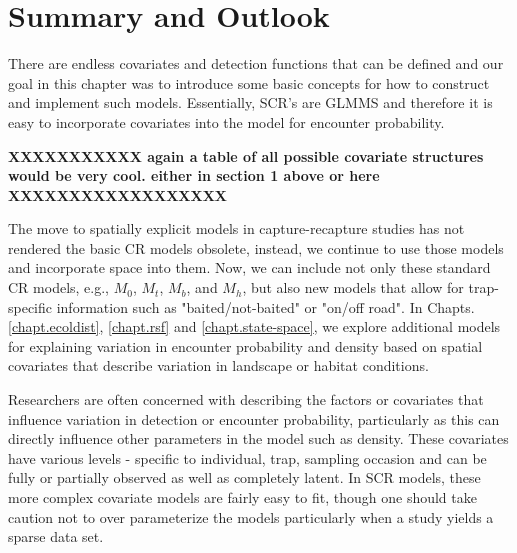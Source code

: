 \section{Summary and Outlook}

There are endless covariates and detection functions that can be defined
and our goal in this chapter was to introduce some basic concepts for how
to construct and implement such models.  Essentially, SCR's are GLMMS and
therefore it is easy to incorporate covariates into the model for encounter
probability.

{\bf XXXXXXXXXXX again a table of all possible covariate structures
  would be very cool. either in section 1 above or here XXXXXXXXXXXXXXXXXX}

The move to spatially explicit models in capture-recapture studies has not rendered the
basic CR models \citep{otis_etal:1978}
obsolete, instead, we continue to use those models and incorporate
space into them. Now, we can include not only these standard CR models, 
e.g., $M_0$, $M_t$, $M_b$, and $M_h$, but also new models that allow for trap-specific
information such as "baited/not-baited" or "on/off road".  In
Chapts. \ref{chapt.ecoldist}, \ref{chapt.rsf} and
\ref{chapt.state-space}, we explore additional models 
for explaining variation in encounter probability and density
based on spatial covariates that describe variation in landscape or
habitat conditions. 

Researchers are often concerned with describing the factors or covariates that influence
variation in detection or encounter probability, particularly as this can directly influence
other parameters in the model such as density.  These covariates have various levels - specific
to individual, trap, sampling occasion and can be fully or partially observed as well as 
completely latent.  In SCR models, these more complex covariate models are fairly easy to fit, 
though one should take caution not to over parameterize the models
particularly when a study yields a sparse data set.


\begin{comment}

Different detection models: We can make up detection models {\it all fucking
day}, to no end, with no point, and with no biological justification for
any single model. To us this would be bad practice and so we think it is
perfectly fine to pick a model ahead of time and stick with it.

we note that underlying these different models is basically something
to do with the 2nd moment structure of some correlated spatial process...
i.e., correlation functions (Higdon et al. 1998; etc...) and , insofar
as choosing detection functions is like choosing a correlation function,
it probably wont have much affect on inferences.
\end{comment}


